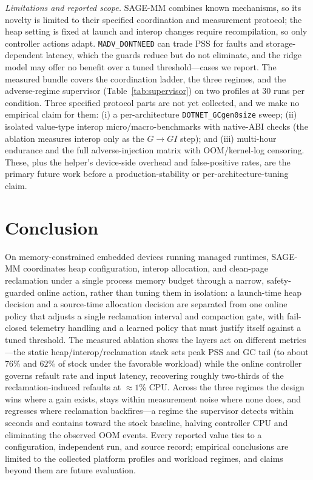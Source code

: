 \emph{Limitations and reported scope.} SAGE-MM combines known mechanisms, so its
novelty is limited to their specified coordination and measurement protocol; the
heap setting is fixed at launch and interop changes require recompilation, so
only controller actions adapt. \texttt{MADV\_DONTNEED} can trade PSS for faults
and storage-dependent latency, which the guards reduce but do not eliminate, and
the ridge model may offer no benefit over a tuned threshold---cases we report.
The measured bundle covers the coordination ladder, the three regimes, and the
adverse-regime supervisor (Table~\ref{tab:supervisor}) on two profiles at $30$
runs per condition. Three specified protocol parts are not yet collected, and we
make no empirical claim for them: (i) a per-architecture
\texttt{DOTNET\_GCgen0size} sweep; (ii) isolated value-type interop
micro/macro-benchmarks with native-ABI checks (the ablation measures interop only
as the $G{\to}GI$ step); and (iii) multi-hour endurance and the full
adverse-injection matrix with OOM/kernel-log censoring. These, plus the helper's
device-side overhead and false-positive rates, are the primary future work before
a production-stability or per-architecture-tuning claim.

\section{Conclusion}
\label{sec:conclusion}

On memory-constrained embedded devices running managed runtimes, SAGE-MM
coordinates heap configuration, interop allocation, and clean-page reclamation
under a single process memory budget through a narrow, safety-guarded online
action, rather than tuning them in isolation: a
launch-time heap decision and a source-time allocation decision are separated from
one online policy that adjusts a single reclamation interval and compaction gate,
with fail-closed telemetry handling and a learned policy that must justify itself
against a tuned threshold. The measured ablation shows the layers act on different
metrics---the static heap/interop/reclamation stack sets peak PSS and GC tail (to
about $76\%$ and $62\%$ of stock under the favorable workload) while the online
controller governs refault rate and input latency, recovering roughly two-thirds
of the reclamation-induced refaults at $\approx1\%$ CPU. Across the three regimes
the design wins where a gain exists, stays within measurement noise where none
does, and regresses where reclamation backfires---a regime the supervisor detects
within seconds and contains toward the stock baseline, halving controller CPU and
eliminating the observed OOM events. Every reported value ties to a configuration,
independent run, and source record; empirical conclusions are limited to the
collected platform profiles and workload regimes, and claims beyond them are
future evaluation. \MeasurementAbstract{}

